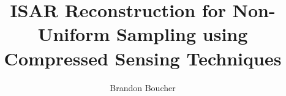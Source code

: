 \documentclass[conference]{IEEEtran}
\begin{document}
\title{ISAR Reconstruction for Non-Uniform Sampling using Compressed Sensing Techniques}

\author{Brandon Boucher}
\maketitle
\end{document}

